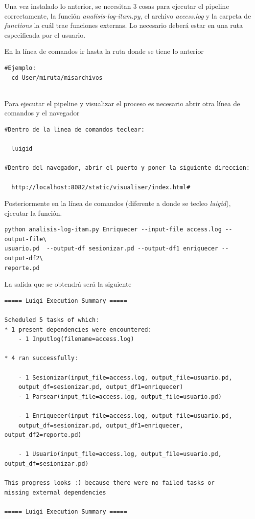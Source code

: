 Una vez instalado lo anterior, se necesitan 3 cosas para ejecutar el
pipeline correctamente, la función \emph{analisis-log-itam.py}, el
archivo \emph{access.log} y la carpeta de \emph{functions} la cuál trae
funciones externas. Lo necesario deberá estar en una ruta especificada
por el usuario.

En la línea de comandos ir hasta la ruta donde se tiene lo anterior

\begin{lstlisting}
#Ejemplo:
  cd User/miruta/misarchivos
  
\end{lstlisting}

Para ejecutar el pipeline y visualizar el proceso es necesario abrir
otra línea de comandos y el navegador

\begin{lstlisting}
#Dentro de la linea de comandos teclear:

  luigid

#Dentro del navegador, abrir el puerto y poner la siguiente direccion:

  http://localhost:8082/static/visualiser/index.html#
\end{lstlisting}

Posteriormente en la línea de comandos (diferente a donde se tecleo
\emph{luigid}), ejecutar la función.

\begin{lstlisting}
python analisis-log-itam.py Enriquecer --input-file access.log --output-file\
usuario.pd  --output-df sesionizar.pd --output-df1 enriquecer --output-df2\
reporte.pd
\end{lstlisting}

La salida que se obtendrá será la siguiente

\begin{lstlisting}
===== Luigi Execution Summary =====

Scheduled 5 tasks of which:
* 1 present dependencies were encountered:
    - 1 Inputlog(filename=access.log)
    
* 4 ran successfully:

    - 1 Sesionizar(input_file=access.log, output_file=usuario.pd,
    output_df=sesionizar.pd, output_df1=enriquecer)
    - 1 Parsear(input_file=access.log, output_file=usuario.pd)
    
    - 1 Enriquecer(input_file=access.log, output_file=usuario.pd,
    output_df=sesionizar.pd, output_df1=enriquecer, output_df2=reporte.pd)
    
    - 1 Usuario(input_file=access.log, output_file=usuario.pd, output_df=sesionizar.pd)

This progress looks :) because there were no failed tasks or
missing external dependencies

===== Luigi Execution Summary =====
\end{lstlisting}

